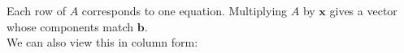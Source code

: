 \documentclass[preview]{standalone}
\begin{document}
\begin{center}
Each row of $A$ corresponds to one equation. Multiplying $A$ by $\mathbf{x}$ gives a vector whose components match $\mathbf{b}$.\\We can also view this in column form:
\end{center}
\end{document}
